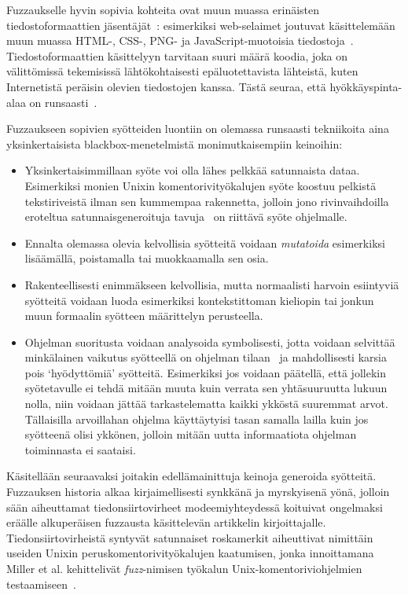 Fuzzaukselle hyvin sopivia kohteita ovat muun muassa erinäisten tiedostoformaattien jäsentäjät~\cite{SageArtikkeli,OuluBrowser}:
esimerkiksi web-selaimet joutuvat käsittelemään muun muassa
HTML-, CSS-, PNG- ja JavaScript-muotoisia tiedostoja~\cite{OuluBrowser}.
Tiedostoformaattien käsittelyyn tarvitaan suuri määrä koodia,
joka on välittömissä tekemisissä lähtökohtaisesti epäluotettavista lähteistä, kuten Internetistä peräisin olevien tiedostojen kanssa.
Tästä seuraa, että hyökkäyspinta-alaa on runsaasti~\cite{OuluBrowser}.

Fuzzaukseen sopivien syötteiden luontiin on olemassa runsaasti tekniikoita
aina yksinkertaisista blackbox-menetelmistä monimutkaisempiin keinoihin:
\begin{itemize}
    \item Yksinkertaisimmillaan syöte voi olla lähes pelkkää satunnaista dataa.
          Esimerkiksi monien Unixin komentorivityökalujen syöte koostuu pelkistä tekstiriveistä
          ilman sen kummempaa rakennetta,
          jolloin jono rivinvaihdoilla eroteltua satunnaisgeneroituja
          tavuja~\cite{UnixReliability} on riittävä syöte ohjelmalle.
    \item Ennalta olemassa olevia kelvollisia syötteitä voidaan \emph{mutatoida} esimerkiksi
          lisäämällä, poistamalla tai muokkaamalla sen osia.
    \item Rakenteellisesti enimmäkseen kelvollisia, mutta normaalisti harvoin esiintyviä syötteitä voidaan
          luoda esimerkiksi kontekstittoman kieliopin tai jonkun muun formaalin syötteen määrittelyn perusteella.
    \item Ohjelman suoritusta voidaan analysoida symbolisesti, jotta voidaan
          selvittää minkälainen vaikutus syötteellä on ohjelman tilaan~\cite{SageArtikkeli}
          ja mahdollisesti karsia pois `hyödyttömiä' syötteitä.
          Esimerkiksi jos voidaan päätellä, että jollekin syötetavulle ei tehdä mitään muuta kuin
          verrata sen yhtäsuuruutta lukuun nolla,
          niin voidaan jättää tarkastelematta kaikki ykköstä suuremmat arvot.
          Tällaisilla arvoillahan ohjelma käyttäytyisi tasan samalla lailla
          kuin jos syötteenä olisi ykkönen,
          jolloin mitään uutta informaatiota ohjelman toiminnasta ei saataisi.

\end{itemize}

\fixme[wut?]
Kä\-si\-tel\-lään seuraavaksi joitakin e\-del\-lä\-mai\-nit\-tu\-ja keinoja generoida syötteitä.
Fuzzauksen historia alkaa kirjaimellisesti synkkänä ja myrskyisenä yönä,
jolloin sään aiheuttamat tiedonsiirtovirheet modeemiyhteydessä koituivat ongelmaksi
eräälle alkuperäisen fuzzausta käsittelevän artikkelin kirjoittajalle\cite{UnixReliability}.
Tiedonsiirtovirheistä syntyvät satunnaiset roskamerkit aiheuttivat nimittäin
useiden Unixin peruskomentorivityökalujen kaatumisen,
jonka innoittamana Miller et al. kehittelivät \emph{fuzz}-nimisen työkalun Unix-komentoriviohjelmien testaamiseen~\cite{UnixReliability}.

